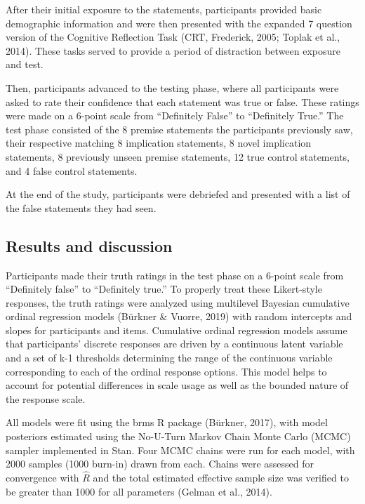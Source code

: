 \documentclass[10pt, letterpaper]{article}
\begin{document}
After their initial exposure to the statements, participants provided
basic demographic information and were then presented with the expanded
7 question version of the Cognitive Reflection Task (CRT, Frederick,
2005; Toplak et al., 2014). These tasks served to provide a period of
distraction between exposure and test.

Then, participants advanced to the testing phase, where all participants
were asked to rate their confidence that each statement was true or
false. These ratings were made on a 6-point scale from ``Definitely
False'' to ``Definitely True.'' The test phase consisted of the 8
premise statements the participants previously saw, their respective
matching 8 implication statements, 8 novel implication statements, 8
previously unseen premise statements, 12 true control statements, and 4
false control statements.

At the end of the study, participants were debriefed and presented with
a list of the false statements they had seen.

\hypertarget{results-and-discussion}{%
\subsection{Results and discussion}\label{results-and-discussion}}

Participants made their truth ratings in the test phase on a 6-point
scale from ``Definitely false'' to ``Definitely true.'' To properly
treat these Likert-style responses, the truth ratings were analyzed
using multilevel Bayesian cumulative ordinal regression models (Bürkner
\& Vuorre, 2019) with random intercepts and slopes for participants and
items. Cumulative ordinal regression models assume that participants'
discrete responses are driven by a continuous latent variable and a set
of k-1 thresholds determining the range of the continuous variable
corresponding to each of the ordinal response options. This model helps
to account for potential differences in scale usage as well as the
bounded nature of the response scale.

All models were fit using the brms R package (Bürkner, 2017), with model
posteriors estimated using the No-U-Turn Markov Chain Monte Carlo (MCMC)
sampler implemented in Stan. Four MCMC chains were run for each model,
with 2000 samples (1000 burn-in) drawn from each. Chains were assessed
for convergence with \(\hat{R}\) and the total estimated effective
sample size was verified to be greater than 1000 for all parameters
(Gelman et al., 2014).
\end{document}

